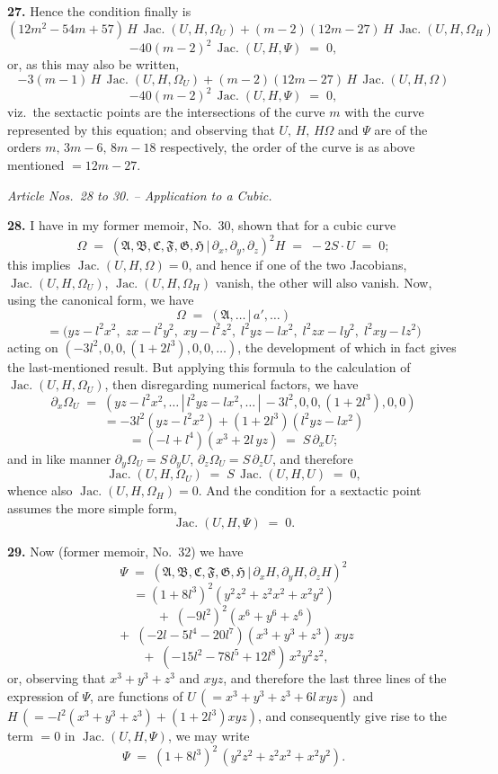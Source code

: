 \documentclass[11pt,a4paper]{article}
\providecommand{\mid}{\,|\,}
\providecommand{\Jac}{\operatorname{Jac.}}
\begin{document}
\medskip

\textbf{27.} Hence the condition finally is
\[
(12m^2-54m+57)\,H\,\Jac(U,H,\Omega_U) + (m-2)(12m-27)\,H\,\Jac(U,H,\Omega_H)
\]
\[
- 40(m-2)^2\,\Jac(U,H,\Psi) \;=\; 0,
\]
or, as this may also be written,
\[
-3(m-1)\,H\,\Jac(U,H,\Omega_U) + (m-2)(12m-27)\,H\,\Jac(U,H,\Omega)
\]
\[
- 40(m-2)^2\,\Jac(U,H,\Psi) \;=\; 0,
\]
viz.\ the sextactic points are the intersections of the curve $m$ with the curve represented by this equation; and observing that $U,\,H,\,H\Omega$ and $\Psi$ are of the orders $m,\,3m-6,\,8m-18$ respectively, the order of the curve is as above mentioned $=12m-27$.

\bigskip

\begin{center}
\textit{Article Nos.\ 28 to 30. -- Application to a Cubic.}
\end{center}

\textbf{28.} I have in my former memoir, No.~30, shown that for a cubic curve
\[
\Omega \;=\; (\mathfrak{A},\mathfrak{B},\mathfrak{C},\mathfrak{F},\mathfrak{G},\mathfrak{H}\mid \partial_x,\partial_y,\partial_z)^2 H \;=\; -2S\cdot U \;=\; 0;
\]
this implies $\Jac(U,H,\Omega) = 0$, and hence if one of the two Jacobians, $\Jac(U,H,\Omega_U)$, $\Jac(U,H,\Omega_H)$ vanish, the other will also vanish. Now, using the canonical form, we have
\[
\Omega \;=\; (\mathfrak{A},\ldots\mid a',\ldots)
\]
\[
= \bigl(yz - l^2 x^2,\; zx - l^2 y^2,\; xy - l^2 z^2,\; l^2 yz - lx^2,\; l^2 zx - ly^2,\; l^2 xy - lz^2\bigr)
\]
acting on $(-3l^2, 0, 0, (1+2l^3), 0, 0,\ldots)$, the development of which in fact gives the last-mentioned result. But applying this formula to the calculation of $\Jac(U,H,\Omega_U)$, then disregarding numerical factors, we have
\[
\partial_x \Omega_U \;=\; (yz - l^2 x^2,\ldots\mid l^2 yz - lx^2,\ldots\mid -3l^2, 0, 0, (1+2l^3), 0, 0)
\]
\[
= -3l^2(yz - l^2 x^2) + (1 + 2l^3)(l^2 yz - lx^2)
\]
\[
= (-l + l^4)(x^3 + 2l\,yz) \;=\; S\,\partial_x U;
\]
and in like manner $\partial_y \Omega_U = S\,\partial_y U$, $\partial_z \Omega_U = S\,\partial_z U$, and therefore
\[
\Jac(U,H,\Omega_U) \;=\; S\,\Jac(U,H,U) \;=\; 0,
\]
whence also $\Jac(U,H,\Omega_H) = 0$. And the condition for a sextactic point assumes the more simple form,
\[
\Jac(U,H,\Psi) \;=\; 0.
\]

\medskip

\textbf{29.} Now (former memoir, No.~32) we have
\[
\Psi \;=\; (\mathfrak{A},\mathfrak{B},\mathfrak{C},\mathfrak{F},\mathfrak{G},\mathfrak{H}\mid \partial_x H,\partial_y H,\partial_z H)^2
\]
\[
= (1 + 8l^3)^2 (y^2 z^2 + z^2 x^2 + x^2 y^2)
\]
\[
\;+\; (-9 l^2)^2 (x^6 + y^6 + z^6)
\]
\[
\;+\; (-2l - 5l^4 - 20l^7)(x^3 + y^3 + z^3)\,xyz
\]
\[
\;+\; (-15l^2 - 78l^5 + 12l^8)\,x^2 y^2 z^2,
\]
or, observing that $x^3 + y^3 + z^3$ and $xyz$, and therefore the last three lines of the expression of $\Psi$, are functions of $U\,(= x^3 + y^3 + z^3 + 6l\,xyz)$ and $H\,(= -l^2(x^3+y^3+z^3) + (1+2l^3)xyz)$, and consequently give rise to the term $= 0$ in $\Jac(U,H,\Psi)$, we may write
\[
\Psi \;=\; (1+8l^3)^2\,(y^2 z^2 + z^2 x^2 + x^2 y^2).
\]
\end{document}
